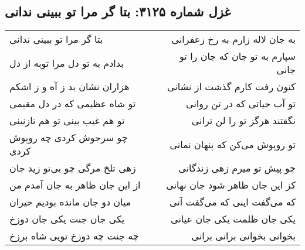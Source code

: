 \begin{center}
\section*{غزل شماره ۳۱۲۵: بتا گر مرا تو ببینی ندانی}
\label{sec:3125}
\begin{longtable}{l p{0.5cm} r}
بتا گر مرا تو ببینی ندانی
&&
به جان لاله زارم به رخ زعفرانی
\\
بدادم به تو دل مرا توبه از دل
&&
سپارم به تو جان که جان را تو جانی
\\
هزاران نشان بد ز آه و ز اشکم
&&
کنون رفت کارم گذشت از نشانی
\\
تو شاه عظیمی که در دل مقیمی
&&
تو آب حیاتی که در تن روانی
\\
تو هم غیب بینی تو هم نازنینی
&&
نگفتند هرگز تو را لن ترانی
\\
چو سرجوش کردی چه روپوش کردی
&&
تو روپوش می‌کن که پنهان نمانی
\\
زهی تلخ مرگی چو بی‌تو زید جان
&&
چو پیش تو میرم زهی زندگانی
\\
از این جان ظاهر به جان آمدم من
&&
کز این جان ظاهر شود جان نهانی
\\
میان دو جان مانده بودیم حیران
&&
که می‌گفت اینی که می‌گفت آنی
\\
یکی جان جنت یکی جان دوزخ
&&
یکی جان ظلمت یکی جان عیانی
\\
چه جنت چه دوزخ تویی شاه برزخ
&&
بخوانی بخوانی برانی برانی
\\
\end{longtable}
\end{center}
